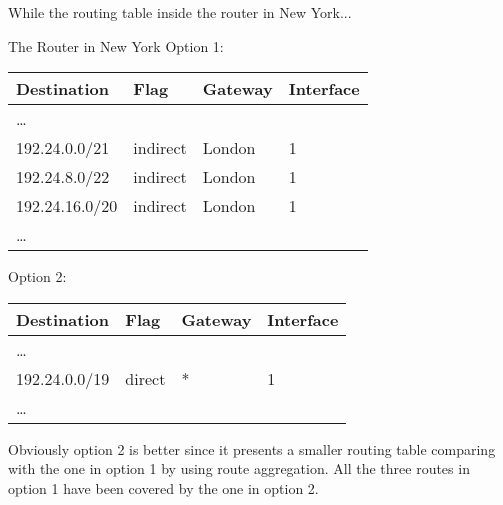 While the routing table inside the router in New York...

\begin{frame}
  \begin{iblock}{The Router in New York}
    Option 1:
    \begin{center}{\ttfamily
        \begin{tabular}{llll}
          \toprule
          Destination&Flag&Gateway&Interface\\\midrule
          \ldots&&&\\
          192.24.0.0/21&indirect&London&1\\
          192.24.8.0/22&indirect&London&1\\
          192.24.16.0/20&indirect&London&1\\
          \ldots&&&\\\bottomrule
        \end{tabular}}
    \end{center}
    Option 2:
    \begin{center}{\ttfamily
        \begin{tabular}{llll}
          \toprule
          Destination&Flag&Gateway&Interface\\\midrule
          \ldots&&&\\
          192.24.0.0/19&direct&*&1\\
          \ldots&&&\\\bottomrule
        \end{tabular}}
    \end{center}
  \end{iblock}
\end{frame}

Obviously option 2 is better since it presents a smaller routing table comparing with the
one in option 1 by using route aggregation. All the three routes in option 1 have been
covered by the one in option 2.

